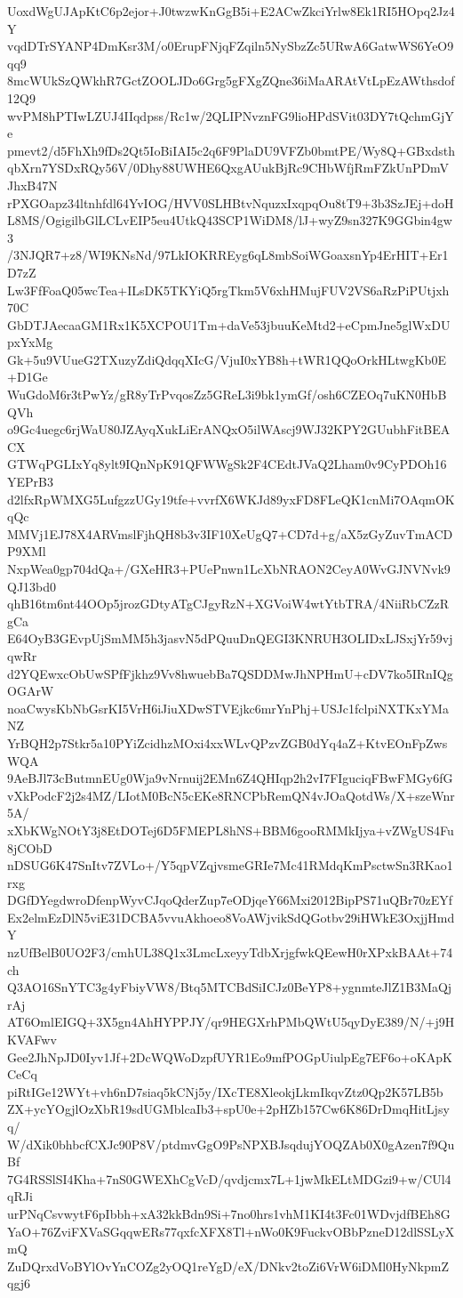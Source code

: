 UoxdWgUJApKtC6p2ejor+J0twzwKnGgB5i+E2ACwZkciYrlw8Ek1RI5HOpq2Jz4Y
vqdDTrSYANP4DmKsr3M/o0ErupFNjqFZqiln5NySbzZc5URwA6GatwWS6YeO9qq9
8mcWUkSzQWkhR7GctZOOLJDo6Grg5gFXgZQne36iMaARAtVtLpEzAWthsdof12Q9
wvPM8hPTIwLZUJ4IIqdpss/Rc1w/2QLIPNvznFG9lioHPdSVit03DY7tQchmGjYe
pmevt2/d5FhXh9fDs2Qt5IoBiIAI5c2q6F9PlaDU9VFZb0bmtPE/Wy8Q+GBxdsth
qbXrn7YSDxRQy56V/0Dhy88UWHE6QxgAUukBjRc9CHbWfjRmFZkUnPDmVJhxB47N
rPXGOapz34ltnhfdl64YvIOG/HVV0SLHBtvNquzxIxqpqOu8tT9+3b3SzJEj+doH
L8MS/OgigilbGlLCLvEIP5eu4UtkQ43SCP1WiDM8/lJ+wyZ9sn327K9GGbin4gw3
/3NJQR7+z8/WI9KNsNd/97LkIOKRREyg6qL8mbSoiWGoaxsnYp4ErHIT+Er1D7zZ
Lw3FfFoaQ05wcTea+ILsDK5TKYiQ5rgTkm5V6xhHMujFUV2VS6aRzPiPUtjxh70C
GbDTJAecaaGM1Rx1K5XCPOU1Tm+daVe53jbuuKeMtd2+eCpmJne5glWxDUpxYxMg
Gk+5u9VUueG2TXuzyZdiQdqqXIcG/VjuI0xYB8h+tWR1QQoOrkHLtwgKb0E+D1Ge
WuGdoM6r3tPwYz/gR8yTrPvqosZz5GReL3i9bk1ymGf/osh6CZEOq7uKN0HbBQVh
o9Gc4uegc6rjWaU80JZAyqXukLiErANQxO5ilWAscj9WJ32KPY2GUubhFitBEACX
GTWqPGLIxYq8ylt9IQnNpK91QFWWgSk2F4CEdtJVaQ2Lham0v9CyPDOh16YEPrB3
d2lfxRpWMXG5LufgzzUGy19tfe+vvrfX6WKJd89yxFD8FLeQK1cnMi7OAqmOKqQc
MMVj1EJ78X4ARVmslFjhQH8b3v3IF10XeUgQ7+CD7d+g/aX5zGyZuvTmACDP9XMl
NxpWea0gp704dQa+/GXeHR3+PUePnwn1LcXbNRAON2CeyA0WvGJNVNvk9QJ13bd0
qhB16tm6nt44OOp5jrozGDtyATgCJgyRzN+XGVoiW4wtYtbTRA/4NiiRbCZzRgCa
E64OyB3GEvpUjSmMM5h3jasvN5dPQuuDnQEGI3KNRUH3OLIDxLJSxjYr59vjqwRr
d2YQEwxcObUwSPfFjkhz9Vv8hwuebBa7QSDDMwJhNPHmU+cDV7ko5IRnIQgOGArW
noaCwysKbNbGsrKI5VrH6iJiuXDwSTVEjkc6mrYnPhj+USJc1fclpiNXTKxYMaNZ
YrBQH2p7Stkr5a10PYiZcidhzMOxi4xxWLvQPzvZGB0dYq4aZ+KtvEOnFpZwsWQA
9AeBJl73cButmnEUg0Wja9vNrnuij2EMn6Z4QHIqp2h2vI7FIguciqFBwFMGy6fG
vXkPodcF2j2s4MZ/LIotM0BcN5cEKe8RNCPbRemQN4vJOaQotdWs/X+szeWnr5A/
xXbKWgNOtY3j8EtDOTej6D5FMEPL8hNS+BBM6gooRMMkIjya+vZWgUS4Fu8jCObD
nDSUG6K47SnItv7ZVLo+/Y5qpVZqjvsmeGRIe7Mc41RMdqKmPsctwSn3RKao1rxg
DGfDYegdwroDfenpWyvCJqoQderZup7eODjqeY66Mxi2012BipPS71uQBr70zEYf
Ex2elmEzDlN5viE31DCBA5vvuAkhoeo8VoAWjvikSdQGotbv29iHWkE3OxjjHmdY
nzUfBelB0UO2F3/cmhUL38Q1x3LmcLxeyyTdbXrjgfwkQEewH0rXPxkBAAt+74ch
Q3AO16SnYTC3g4yFbiyVW8/Btq5MTCBdSiICJz0BeYP8+ygnmteJlZ1B3MaQjrAj
AT6OmlEIGQ+3X5gn4AhHYPPJY/qr9HEGXrhPMbQWtU5qyDyE389/N/+j9HKVAFwv
Gee2JhNpJD0Iyv1Jf+2DcWQWoDzpfUYR1Eo9mfPOGpUiulpEg7EF6o+oKApKCeCq
piRtIGe12WYt+vh6nD7siaq5kCNj5y/IXcTE8XleokjLkmIkqvZtz0Qp2K57LB5b
ZX+ycYOgjlOzXbR19sdUGMblcaIb3+spU0e+2pHZb157Cw6K86DrDmqHitLjsyq/
W/dXik0bhbcfCXJc90P8V/ptdmvGgO9PsNPXBJsqdujYOQZAb0X0gAzen7f9QuBf
7G4RSSlSI4Kha+7nS0GWEXhCgVcD/qvdjcmx7L+1jwMkELtMDGzi9+w/CUl4qRJi
urPNqCsvwytF6pIbbh+xA32kkBdn9Si+7no0hrs1vhM1KI4t3Fc01WDvjdfBEh8G
YaO+76ZviFXVaSGqqwERs77qxfcXFX8Tl+nWo0K9FuckvOBbPzneD12dlSSLyXmQ
ZuDQrxdVoBYlOvYnCOZg2yOQ1reYgD/eX/DNkv2toZi6VrW6iDMl0HyNkpmZqgj6
